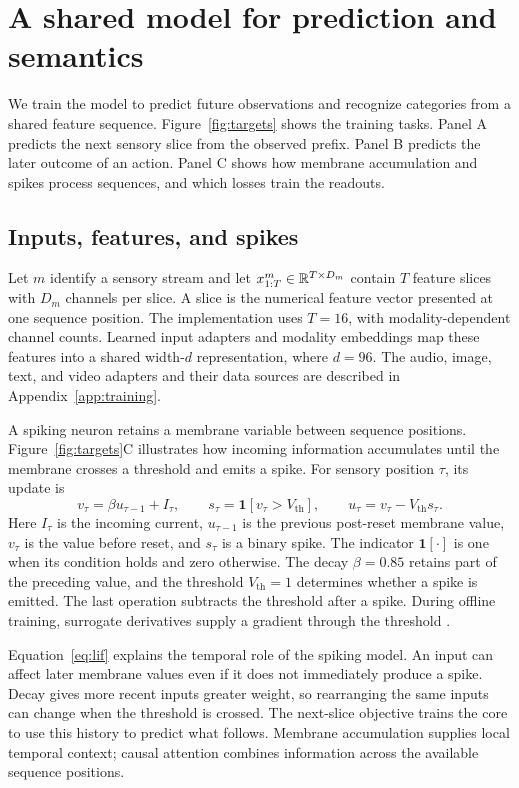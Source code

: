 \section{A shared model for prediction and semantics}
\label{sec:model}
We train the model to predict future observations and recognize categories
from a shared feature sequence. Figure~\ref{fig:targets} shows the training
tasks. Panel A predicts the next sensory slice from the observed prefix.
Panel B predicts the later outcome of an action. Panel C shows how membrane
accumulation and spikes process sequences, and which losses train the readouts.

\subsection{Inputs, features, and spikes}
Let $m$ identify a sensory stream and let
$x^m_{1:T}\in\mathbb{R}^{T\times D_m}$ contain $T$ feature slices with $D_m$ channels
per slice. A slice is the numerical feature vector presented at one sequence
position. The implementation uses $T=16$, with modality-dependent channel
counts. Learned input adapters and modality embeddings map these features
into a shared width-$d$ representation, where $d=96$.
The audio, image, text, and video adapters and their data sources are described
in Appendix~\ref{app:training}.

A spiking neuron retains a membrane variable between sequence positions.
Figure~\ref{fig:targets}C illustrates how incoming information accumulates
until the membrane crosses a threshold and emits a spike.
For sensory position $\tau$, its update is
\begin{equation}
 v_\tau=\beta u_{\tau-1}+I_\tau,\qquad
 s_\tau=\mathbf{1}[v_\tau>V_{\mathrm{th}}],\qquad
 u_\tau=v_\tau-V_{\mathrm{th}}s_\tau.
 \label{eq:lif}
\end{equation}
Here $I_\tau$ is the incoming current, $u_{\tau-1}$ is the previous post-reset
membrane value, $v_\tau$ is the value before reset, and $s_\tau$ is a binary
spike. The indicator $\mathbf{1}[\cdot]$ is one when its condition holds and
zero otherwise. The decay $\beta=0.85$ retains part of the preceding value, and the
threshold $V_{\mathrm{th}}=1$ determines whether a spike is emitted. The last
operation subtracts the threshold after a spike. During offline training,
surrogate derivatives supply a gradient through the threshold
\citep{neftci2019surrogate,yu2026beyondrate}.

Equation~\eqref{eq:lif} explains the temporal role of the spiking model.
An input can affect later membrane values even if it does not immediately
produce a spike. Decay gives more recent inputs greater weight, so rearranging
the same inputs can change when the threshold is crossed. The next-slice
objective trains the core to use this history to predict what follows.
Membrane accumulation supplies local temporal context; causal attention
combines information across the available sequence positions.

